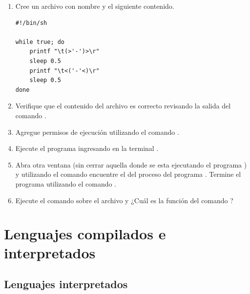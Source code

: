 \documentclass[12pt]{article}
\begin{document}
\begin{enumerate}[resume]

    \item Cree un archivo con nombre  y el siguiente contenido.

        \begin{verbatim}
#!/bin/sh

while true; do
    printf "\t(>'-')>\r"
    sleep 0.5
    printf "\t<('-'<)\r"
    sleep 0.5
done
        \end{verbatim}

    \item Verifique que el contenido del archivo es correcto revisando la
        salida del comando .

    \item Agregue permisos de ejecución utilizando el comando .

    \item Ejecute el programa ingresando en la terminal .

    \item Abra otra ventana (sin cerrar aquella donde se esta ejecutando el
        programa ) y utilizando el comando  encuentre el
         del proceso del programa . Termine el programa
        utilizando el comando .

    \item Ejecute el comando  sobre el archivo  y
         ¿Cuál es la función del comando ?

\end{enumerate}

\section{Lenguajes compilados e interpretados}

\subsection{Lenguajes interpretados}
\end{document}
